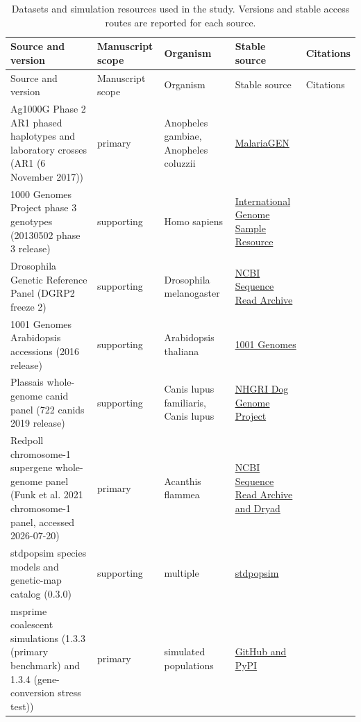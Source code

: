 \begin{longtable}{@{}p{}p{}p{}p{}p{}@{}}
\caption{Datasets and simulation resources used in the study. Versions and stable access routes are reported for each source.}\label{tab:data-sources}\\
\toprule Source and version & Manuscript scope & Organism & Stable source & Citations \\
\midrule\endfirsthead
\toprule Source and version & Manuscript scope & Organism & Stable source & Citations \\
\midrule\endhead
Ag1000G Phase 2 AR1 phased haplotypes and laboratory crosses (AR1 (6 November 2017)) & primary & Anopheles gambiae, Anopheles coluzzii & \href{https://www.malariagen.net/data_package/ag1000g-phase-2-ar1/}{MalariaGEN} & \citep{malariagen_phase2_ar1_2017,ag1000g2020} \\
1000 Genomes Project phase 3 genotypes (20130502 phase 3 release) & supporting & Homo sapiens & \href{https://ftp.1000genomes.ebi.ac.uk/vol1/ftp/release/20130502/}{International Genome Sample Resource} & \citep{1000genomes2015} \\
Drosophila Genetic Reference Panel (DGRP2 freeze 2) & supporting & Drosophila melanogaster & \href{https://www.ncbi.nlm.nih.gov/sra?term=DGRP}{NCBI Sequence Read Archive} & \citep{mackay2012dgrp,huang2014dgrp} \\
1001 Genomes Arabidopsis accessions (2016 release) & supporting & Arabidopsis thaliana & \href{https://1001genomes.org/data/GMI-MPI/releases/v3.1/}{1001 Genomes} & \citep{genomes1001_2016,salome2012arabidopsis,rowan2019crossovers} \\
Plassais whole-genome canid panel (722 canids 2019 release) & supporting & Canis lupus familiaris, Canis lupus & \href{https://research.nhgri.nih.gov/dog_genome/downloads/datasets/WGS/722g.990.SNP.INDEL.chrAll.vcf.gz}{NHGRI Dog Genome Project} & \citep{plassais2019canids} \\
Redpoll chromosome-1 supergene whole-genome panel (Funk et al. 2021 chromosome-1 panel, accessed 2026-07-20) & primary & Acanthis flammea & \href{https://doi.org/10.5061/dryad.q83bk3jjm}{NCBI Sequence Read Archive and Dryad} & \citep{funk2021redpoll} \\
stdpopsim species models and genetic-map catalog (0.3.0) & supporting & multiple & \href{https://github.com/popsim-consortium/stdpopsim/releases/tag/0.3.0}{stdpopsim} & \citep{adrion2020stdpopsim} \\
msprime coalescent simulations (1.3.3 (primary benchmark) and 1.3.4 (gene-conversion stress test)) & primary & simulated populations & \href{https://github.com/tskit-dev/msprime/releases/tag/1.3.4}{GitHub and PyPI} & \citep{baumdicker2022msprime} \\

\end{longtable}
